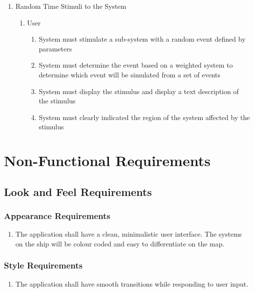 \documentclass[12pt, titlepage]{article}
\begin{document}
\begin{enumerate}[{BE}1.]
	\item Random Time Stimuli to the System
	\begin{enumerate}[{VP9}.1]
		\item User
			\begin{enumerate}
				\item System must stimulate a sub-system with a random event defined by parameters
				\item System must determine the event based on a weighted system to determine which event will be simulated from a set of events
				\item System must display the stimulus and display a text description of the stimulus
				\item System must clearly indicated the region of the system affected by the stimulus
			\end{enumerate}
	\end{enumerate}
	
	
\end{enumerate}



\section{Non-Functional Requirements}
\label{sec:non-functional_requirements}
\subsection{Look and Feel Requirements}
\label{sub:look_and_feel_requirements}

\subsubsection{Appearance Requirements}
\label{ssub:appearance_requirements}
\begin{enumerate}[{LF}1. ]
	\item The application shall have a clean, minimalistic user interface. The systems on the ship will be colour coded and easy to differentiate on the map.
\end{enumerate}

\subsubsection{Style Requirements}
\label{ssub:style_requirements}
\begin{enumerate}[{LF}2. ]
	\item The application shall have smooth transitions while responding to user input. 
\end{enumerate}
\end{document}
